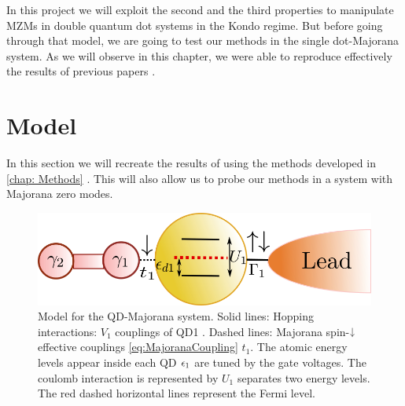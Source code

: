 
In this project we will exploit the second and the third properties to manipulate MZMs in double quantum dot systems in the Kondo regime. But before going through that model, we are going to test our methods in the single dot-Majorana system. As we will observe in this chapter, we were able to reproduce effectively the results of previous papers \cite{dias_da_silva_transmission_2008,liu_detecting_2011} .


\section{Model}

In this section we will recreate the results of \citeauthor{liu_detecting_2011} using the methods developed in \ref{chap: Methods} . This will also allow us to probe our methods in a system with Majorana zero modes. 

\begin{figure}[t]
    \centering
    \includegraphics[scale=0.6]{IMAGES/Majorana/QD-M.png}
    \caption{\label{fig:ModelM-QD} Model for the QD-Majorana system. Solid lines: Hopping interactions: $V_1$ couplings of QD1 . Dashed lines: Majorana spin-$\downarrow$ effective couplings \eqref{eq:MajoranaCoupling} $t_1$. The atomic energy levels appear inside each QD $\epsilon_1$ are tuned by the gate voltages. The coulomb interaction is represented by $U_1$ separates two energy levels.  The red dashed horizontal lines represent the Fermi level. }
\end{figure}

